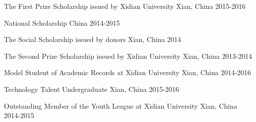 
\begin{cvhonors}

  \cvhonor
    {The First Prize Scholarship} %
    { issued by Xidian University} %
    {Xian, China } %
    {2015-2016} %

  \cvhonor
    {National Scholarship} %
    {} %
    {China } %
    {2014-2015} %

  \cvhonor
    {The Social Scholarship} %
    {issued by donors} %
   {Xian, China } %
    {2014} %

  \cvhonor
    {The Second Prize Scholarship} %
	{issued by Xidian University}
    {Xian, China } %
    {2013-2014} %
    
\end{cvhonors}


\begin{cvhonors}
	
	 \cvhonor
	{Model Student of Academic Records at Xidian University } %
	{} %
	{Xian, China} %
	{2014-2016} %

	\cvhonor
	{Technology Talent Undergraduate} %
	{} %
	{Xian, China} %
	{2015-2016} %
	
	\cvhonor
	{Outstanding Member of the Youth League at Xidian University} %
	{} %
	{Xian, China} %
	{2014-2015} %
	
\end{cvhonors}




